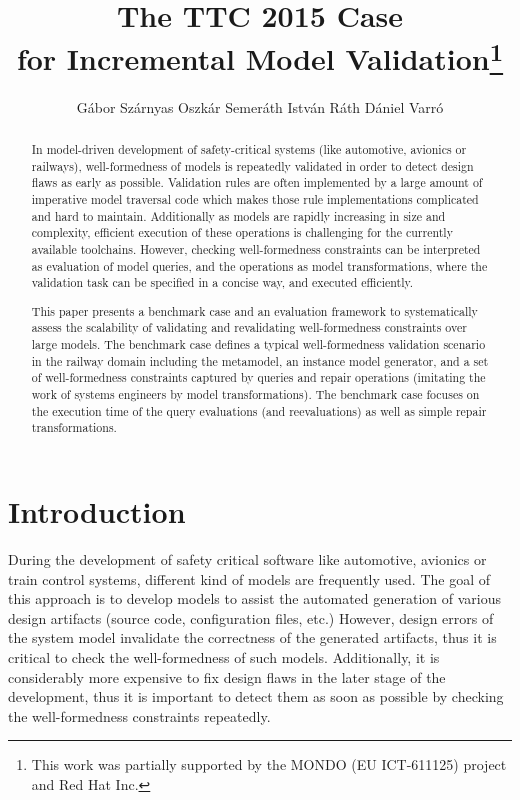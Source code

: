 \documentclass[submission,copyright,creativecommons]{eptcs}
\title{The TTC 2015 \tb Case\\ for Incremental Model Validation\thanks{This work was partially supported by the MONDO (EU ICT-611125) project and Red Hat Inc.}}
\author{G\'{a}bor Sz\'{a}rnyas \qquad Oszk\'{a}r Semer\'{a}th \qquad Istv\'{a}n R\'{a}th \qquad D\'{a}niel Varr\'{o}
\institute{Budapest University of Technology and Economics\\
Department of Measurement and Information Systems\\
H-1117 Magyar tud\'{o}sok krt. 2, Budapest, Hungary}
\email{\{szarnyas, semerath, rath, varro\}@mit.bme.hu}
}
\begin{document}
\maketitle

\begin{abstract}
In model-driven development of safety-critical systems (like automotive, avionics or railways), well-formedness of models is repeatedly validated in order to detect design flaws as early as possible. Validation rules are often implemented by a large amount of imperative model traversal code which makes those rule implementations complicated and hard to maintain. Additionally as models are rapidly increasing in size and complexity, efficient execution of these operations is challenging for the currently available toolchains. However, checking well-formedness constraints can be interpreted as evaluation of model queries, and the operations as model transformations, where the validation task can be specified in a concise way, and executed efficiently.

This paper presents a benchmark case and an evaluation framework to systematically assess the scalability of validating and revalidating well-formedness constraints over large models. The benchmark case defines a typical well-formedness validation scenario in the railway domain including the metamodel, an instance model generator, and a set of well-formedness constraints captured by queries and repair operations (imitating the work of systems engineers by model transformations). The benchmark case focuses on the execution time of the query evaluations (and reevaluations) as well as simple repair transformations.
\end{abstract}

\section{Introduction}

During the development of safety critical software like automotive, avionics or train control systems, different kind of models are frequently used. The goal of this approach is to develop models to assist the automated generation of various design artifacts (source code, configuration files, etc.) However, design errors of the system model invalidate the correctness of the generated artifacts, thus it is critical to check the well-formedness of such models. Additionally, it is considerably more expensive to fix design flaws in the later stage of the development, thus it is important to detect them as soon as possible by checking the well-formedness constraints repeatedly.
\end{document}
